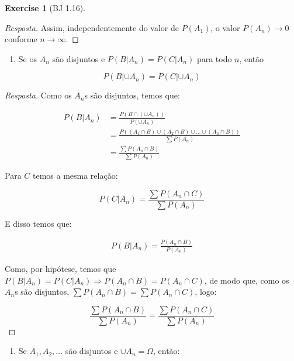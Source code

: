 \documentclass[
]{article}
\providecommand{\tightlist}{%
  \setlength{\itemsep}{0pt}\setlength{\parskip}{0pt}}
\theoremstyle{definition}
\theoremstyle{definition}
\theoremstyle{definition}
\newtheorem{exercise}{Exercise}[section]
\theoremstyle{definition}
\theoremstyle{remark}
\begin{document}
\begin{exercise}[BJ 1.16]
\begin{proof}[Resposta]
Assim, independentemente do valor de \(P(A_{1})\), o valor \(P(A_{n}) \to 0\) conforme \(n \to \infty\).
\end{proof}

\begin{enumerate}
\def\labelenumi{\alph{enumi})}
\setcounter{enumi}{3}
\tightlist
\item
  Se os \(A_{n}\) são disjuntos e \(P(B|A_{n}) = P(C|A_{n})\) para todo \(n\), então
\end{enumerate}

\begin{equation*}
P(B|\cup A_{n}) = P(C|\cup A_{n})
\end{equation*}

\begin{proof}[Resposta]
Como os \(A_{n}\)s são disjuntos, temos que:

\begin{align*}
P(B|A_{n}) &= \frac{P(B \cap (\cup A_{n}))}{P(\cup A_{n})} \\
&= \frac{P((A_{1} \cap B) \cup (A_{2} \cap B) \cup \dots \cup (A_{n} \cap B))}{\sum P(A_{n})} \\
&= \frac{\sum P(A_{n} \cap B)}{\sum P(A_{n})}
\end{align*}

Para \(C\) temos a mesma relação:

\begin{equation*}
P(C|A_{n}) = \frac{\sum P(A_{n} \cap C)}{\sum P(A_{n})}
\end{equation*}

E disso temos que:

\begin{align*}
P(B|A_{n}) = \frac{P(A_{n} \cap B)}{P(A_{n})}
\end{align*}

Como, por hipótese, temos que \(P(B|A_{n}) = P(C|A_{n}) \Rightarrow P(A_{n} \cap B) = P(A_{n} \cap C)\), de modo que, como os \(A_{n}\)s são disjuntos, \(\sum P(A_{n} \cap B) = \sum P(A_{n} \cap C)\), logo:

\begin{equation*}
\frac{\sum P(A_{n} \cap B)}{\sum P(A_{n})} = \frac{\sum P(A_{n} \cap C)}{\sum P(A_{n})}
\end{equation*}
\end{proof}

\begin{enumerate}
\def\labelenumi{\alph{enumi})}
\setcounter{enumi}{4}
\tightlist
\item
  Se \(A_{1}, A_{2}, \ldots\) são disjuntos e \(\cup A_{n} = \Omega\), então:
\end{enumerate}


\end{exercise}
\end{document}
